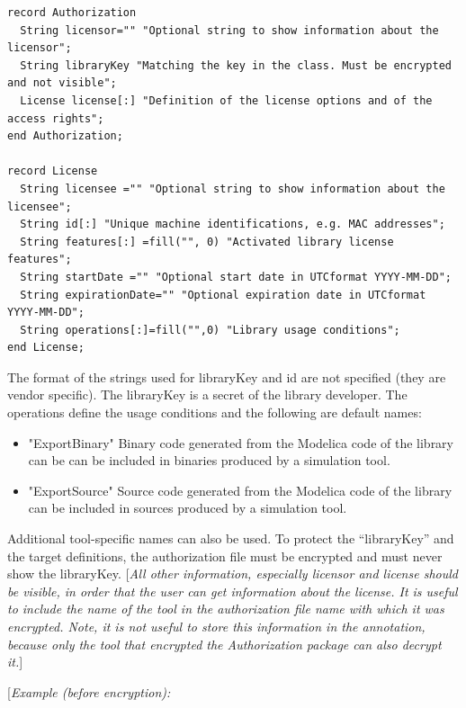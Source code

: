 \documentclass[10pt,a4paper]{report}
\begin{document}
\begin{lstlisting}[language=modelica]
record Authorization
  String licensor="" "Optional string to show information about the licensor";
  String libraryKey "Matching the key in the class. Must be encrypted and not visible";
  License license[:] "Definition of the license options and of the access rights";
end Authorization;

record License
  String licensee ="" "Optional string to show information about the licensee";
  String id[:] "Unique machine identifications, e.g. MAC addresses";
  String features[:] =fill("", 0) "Activated library license features";
  String startDate ="" "Optional start date in UTCformat YYYY-MM-DD";
  String expirationDate="" "Optional expiration date in UTCformat YYYY-MM-DD";
  String operations[:]=fill("",0) "Library usage conditions";
end License;
\end{lstlisting}
The format of the strings used for libraryKey and id are not specified
(they are vendor specific). The libraryKey is a secret of the library
developer. The operations define the usage conditions and the following
are default names:

\begin{itemize}
\item
  "ExportBinary" Binary code generated from the Modelica code of the
  library can be can be included in binaries produced by a simulation
  tool.
\item
  "ExportSource" Source code generated from the Modelica code of the
  library can be included in sources produced by a simulation tool.
\end{itemize}

Additional tool-specific names can also be used. To protect the
``libraryKey'' and the target definitions, the authorization file must
be encrypted and must never show the libraryKey. {[}\emph{All other
information, especially licensor and license should be visible, in order
that the user can get information about the license. It is useful to
include the name of the tool in the authorization file name with which
it was encrypted. Note, it is not useful to store this information in
the annotation, because only the tool that encrypted the Authorization
package can also decrypt it.}{]}

{[}\emph{Example (before encryption):}
\end{document}
